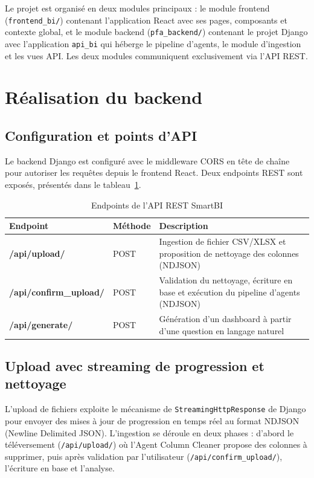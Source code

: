 Le projet est organisé en deux modules principaux : le module frontend (\texttt{frontend\_bi/}) contenant l'application React avec ses pages, composants et contexte global, et le module backend (\texttt{pfa\_backend/}) contenant le projet Django avec l'application \texttt{api\_bi} qui héberge le pipeline d'agents, le module d'ingestion et les vues API. Les deux modules communiquent exclusivement via l'API REST.

\section{Réalisation du backend}

\subsection{Configuration et points d'API}

Le backend Django est configuré avec le middleware CORS en tête de chaîne pour autoriser les requêtes depuis le frontend React. Deux endpoints REST sont exposés, présentés dans le tableau~\ref{tab:endpoints}.

\begin{table}[H]
\centering
\renewcommand{\arraystretch}{1.5} %
\caption{Endpoints de l'API REST SmartBI}
\label{tab:endpoints}
\begin{tabularx}{\textwidth}{
    >{\raggedright\arraybackslash\bfseries}l 
    >{\centering\arraybackslash}p{2cm} 
    >{\raggedright\arraybackslash}X
}
\toprule
\textbf{Endpoint} & \textbf{Méthode} & \textbf{Description} \\
\midrule
/api/upload/   & POST & Ingestion de fichier CSV/XLSX et proposition de nettoyage des colonnes (NDJSON) \\
/api/confirm\_upload/ & POST & Validation du nettoyage, écriture en base et exécution du pipeline d'agents (NDJSON) \\
/api/generate/ & POST & Génération d'un dashboard à partir d'une question en langage naturel \\
\bottomrule
\end{tabularx}
\end{table}

\subsection{Upload avec streaming de progression et nettoyage}

L'upload de fichiers exploite le mécanisme de \texttt{StreamingHttpResponse} de Django pour envoyer des mises à jour de progression en temps réel au format NDJSON (Newline Delimited JSON). L'ingestion se déroule en deux phases : d'abord le téléversement (\texttt{/api/upload/}) où l'Agent Column Cleaner propose des colonnes à supprimer, puis après validation par l'utilisateur (\texttt{/api/confirm\_upload/}), l'écriture en base et l'analyse.

